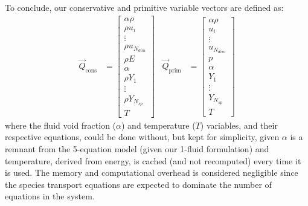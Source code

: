 To conclude, our conservative and primitive variable vectors are defined as:
%
\begin{align*}
    \Vec{Q}_{\text{cons}} & = \left[\begin{array}{c}
        \alpha\rho \\
        \rho u_i \\
        \vdots \\
        \rho u_{N_{dim}} \\
        \rho E \\
        \alpha \\
        \rho Y_1 \\
        \vdots \\
        \rho Y_{N_{sp}} \\
        T
    \end{array}\right]
    &
    \Vec{Q}_{\text{prim}} & = \left[\begin{array}{c}
        \alpha\rho \\
        u_i \\
        \vdots \\
        u_{N_{dim}} \\
        p \\
        \alpha \\
        Y_1 \\
        \vdots \\
        Y_{N_{sp}} \\
        T
    \end{array}\right]
\end{align*}
%
where the fluid void fraction ($\alpha$) and temperature ($T$) variables,
and their respective equations, could be done without, but kept for simplicity,
given $\alpha$ is a remnant from the 5-equation model (given our 1-fluid formulation)
and temperature, derived from energy, is cached (and not recomputed) every time it is used.
The memory and computational overhead is considered negligible since the species transport
equations are expected to dominate the number of equations in the system.